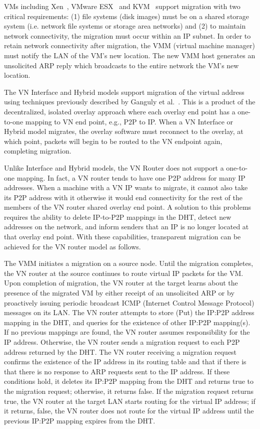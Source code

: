 VMs including Xen~\cite{xen-live}, VMware ESX~\cite{vmotion} and KVM~\cite{kvm}
support migration with two critical requirements: (1) file systems (disk
images) must be on a shared storage system (i.e. network file systems or
storage area networks) and (2) to maintain network connectivity, the migration
must occur within an IP subnet.  In order to retain network connectivity after
migration, the VMM (virtual machine manager) must notify the LAN of the VM's
new location.  The new VMM host generates an unsolicited ARP reply which
broadcasts to the entire network the VM's new location.  

The VN Interface and Hybrid models support migration of the virtual address
using techniques previously described by Ganguly et al.~\cite{ipop}.  This is a
product of the decentralized, isolated overlay approach where each overlay end
point has a one-to-one mapping to VN end point, e.g., P2P to IP.  When a VN
Interface or Hybrid model migrates, the overlay software must reconnect to the
overlay, at which point, packets will begin to be routed to the VN endpoint
again, completing migration.

Unlike Interface and Hybrid models, the VN Router does not support a one-to-one
mapping.  In fact, a VN router tends to have one P2P address for many IP
addresses.  When a machine with a VN IP wants to migrate, it cannot also take
its P2P address with it otherwise it would end connectivity for the rest of the
members of the VN router shared  overlay end point.  A solution to this
problems requires the ability to delete IP-to-P2P mappings in the DHT, detect
new addresses on the network, and inform senders that an IP is no longer
located at that overlay end point.  With these capabilities, transparent
migration can be achieved for the VN router model as follows. 

The VMM initiates a migration on a source node. Until the migration completes,
the VN router at the source continues to route virtual IP packets for the VM.
Upon completion of migration, the VN router at the target learns about the
presence of the migrated VM by either receipt of an unsolicited ARP or by
proactively issuing periodic broadcast ICMP (Internet Control Message Protocol)
messages on its LAN.  The VN router attempts to store (Put) the IP:P2P address
mapping in the DHT, and queries for the existence of other IP:P2P mapping(s).
If no previous mappings are found, the VN router assumes responsibility for the
IP address. Otherwise, the VN router sends a migration request to each P2P
address returned by the DHT. The VN router receiving a migration request
confirms the existence of the IP address in its routing table and that if there
is that there is no response to ARP requests sent to the IP address.  If these
conditions hold, it deletes its IP:P2P mapping from the DHT and returns true to
the migration request; otherwise, it returns false. If the migration request
returns true, the VN router at the target LAN starts routing for the virtual IP
address; if it returns, false, the VN router does not route for the virtual IP
address until the previous IP:P2P mapping expires from the DHT.


